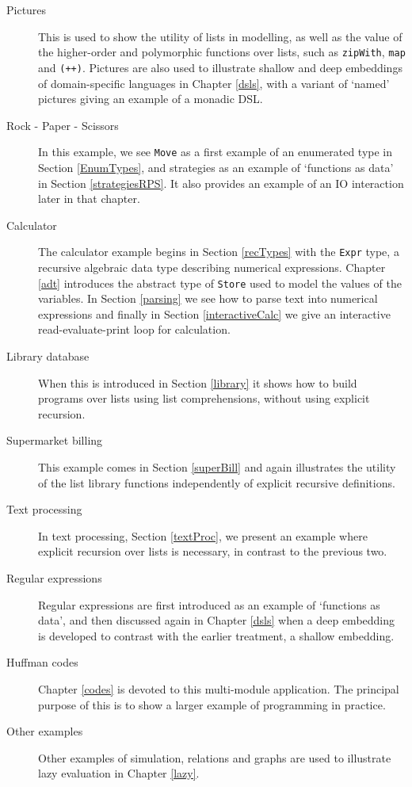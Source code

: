 \begin{description}
\item[Pictures]
This is used to show the utility of lists in modelling, as well as the value of the higher-order and polymorphic functions over lists, such as \texttt{zipWith}, \texttt{map} and \texttt{(++)}. Pictures are also used to illustrate shallow and deep embeddings of domain-specific languages in Chapter \ref{dsls}, with a variant of `named' pictures giving an example of a monadic DSL.
\item[Rock - Paper - Scissors]
In this example, we see \texttt{Move} as a first example of an enumerated type in Section \ref{EnumTypes}, and strategies as an example of `functions as data' in Section \ref{strategiesRPS}. It also provides an example of an IO interaction later in that chapter.
\item[Calculator]
The calculator example begins in Section \ref{recTypes} with the \texttt{Expr} type, a recursive algebraic data type describing numerical expressions. 
 Chapter \ref{adt} introduces the abstract type of 
\texttt{Store} used to model the values of the variables. In  Section \ref{parsing} we see how to parse text into numerical expressions and finally in Section \ref{interactiveCalc} we give an interactive read-evaluate-print loop for calculation.
\item[Library database]
When this is introduced in Section \ref{library} it shows how to build programs over lists using list comprehensions, without using explicit recursion.
\item[Supermarket billing]
This example comes in Section \ref{superBill} and again illustrates the utility of the list library functions independently of explicit recursive definitions.
\item[Text processing]
In text processing, Section \ref{textProc}, we present an example where explicit recursion over lists is necessary, in contrast to the previous two.
\item[Regular expressions]
Regular expressions are first introduced as an example of `functions as data', and then discussed again in Chapter \ref{dsls} when a deep embedding is developed to contrast with the earlier treatment, a shallow embedding.
\item[Huffman codes]
Chapter \ref{codes} is devoted to this multi-module application. The principal purpose of this is to show a larger example of programming in practice.
\item[Other examples]
Other examples of simulation, relations and graphs are used to illustrate lazy evaluation in Chapter \ref{lazy}.
\end{description} 



